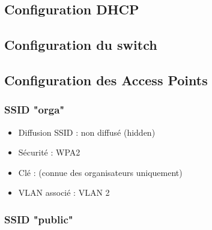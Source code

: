 \documentclass[a4paper,12pt]{article}
\begin{document}
\subsection{Configuration DHCP}


\begin{tcolorbox}[colback=black!90, coltext=green!70!white, fontupper=\ttfamily\small,
  title={\color{white}\small Configuration DHCP}, colbacktitle=primary]
\end{tcolorbox}

\subsection{Configuration du switch}


\begin{tcolorbox}[colback=black!90, coltext=green!70!white, fontupper=\ttfamily\small,
  title={\color{white}\small Configuration Switch 2960}, colbacktitle=primary]
\end{tcolorbox}

\subsection{Configuration des Access Points}


\subsubsection{SSID "orga"}

\begin{itemize}
  \item Diffusion SSID : non diffusé (hidden)
  \item Sécurité : WPA2
  \item Clé : (connue des organisateurs uniquement)
  \item VLAN associé : VLAN 2
\end{itemize}

\subsubsection{SSID "public"}
\end{document}
